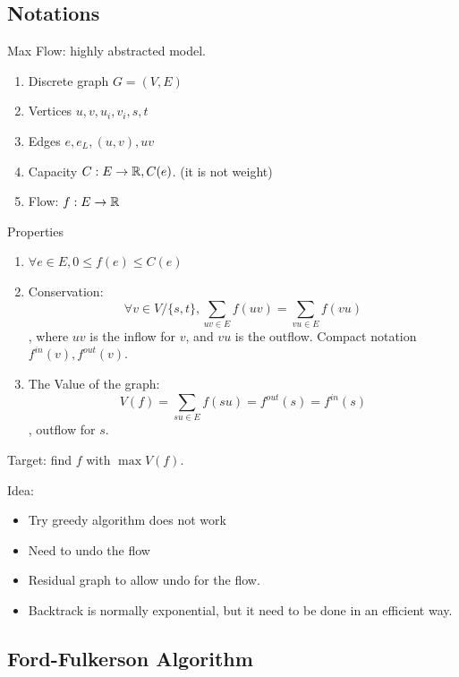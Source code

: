 \documentclass[a4paper]{report}
\theoremstyle{definition}
\begin{document}
\subsection{Notations}
Max Flow: highly abstracted model.
\begin{enumerate}
\item Discrete graph $G=(V,E)$
\item Vertices $u, v, u_i, v_i, s, t$
\item Edges $e, e_L, (u,v), uv$
\item Capacity $C: E\rightarrow \mathbb{R}, C(e)$. (it is not weight)
\item Flow: $f: E\rightarrow \mathbb{R}$
\end{enumerate}
Properties
\begin{enumerate}
\item $\forall e \in E, 0\leq f(e)\leq C(e)$
\item Conservation: $$\forall v\in V/\{s,t\}, \sum_{uv\in E}f(uv)=\sum_{vu\in E}f(vu)$$
, where $uv$ is the inflow for $v$, and $vu$ is the outflow. Compact notation $f^{in}(v), f^{out}(v)$.
\item The Value of the graph:
$$V(f) = \sum_{su\in E}f(su)=f^{out}(s)=f^{in}(s)$$
, outflow for $s$.
\end{enumerate}
Target: find $f$ with $\max V(f)$.

Idea:
\begin{itemize}
\item Try greedy algorithm does not work
\item Need to undo the flow
\item Residual graph to allow undo for the flow.
\item Backtrack is normally exponential, but it need to be done in an efficient way.
\end{itemize}
\subsection{Ford-Fulkerson Algorithm}
\end{document}
